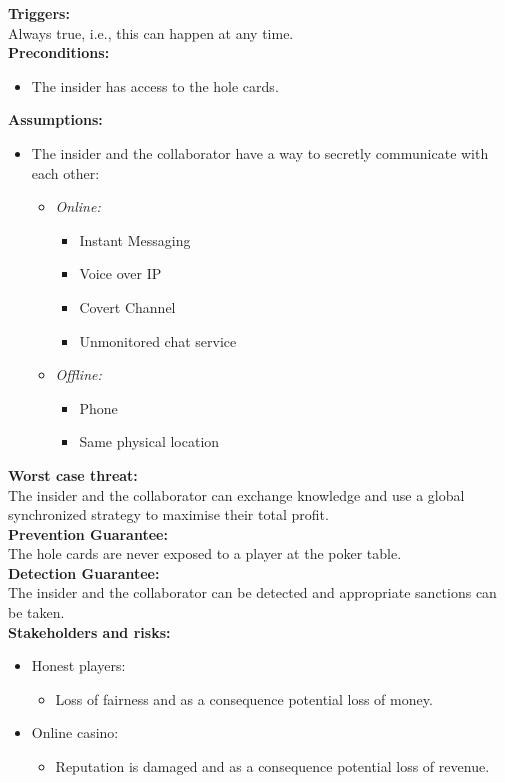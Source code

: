 \documentclass[a4paper,11pt]{report}
\begin{document}
\textbf{Triggers:}\\
Always true, i.e., this can happen at any time. \\
\textbf{Preconditions:}
\begin{itemize}
\item The insider has access to the hole cards.
\end{itemize}
\textbf{Assumptions:}
\begin{itemize}
\item The insider and the collaborator have a way to secretly communicate with each other:
\begin{itemize}
\item \emph{Online:}
\begin{itemize}
\item Instant Messaging
\item Voice over IP
\item Covert Channel
\item Unmonitored chat service
\end{itemize}
\item \emph{Offline:}
\begin{itemize}
\item Phone
\item Same physical location
\end{itemize}
\end{itemize}
\end{itemize}
\textbf{Worst case threat:}\\
The insider and the collaborator can exchange knowledge and use a global synchronized strategy to maximise their total profit. \\
\textbf{Prevention Guarantee:} \\
The hole cards are never exposed to a player at the poker table. \\
\textbf{Detection Guarantee:} \\
The insider and the collaborator can be detected and appropriate sanctions can be taken. \\
\textbf{Stakeholders and risks:}
\begin{itemize}
\item Honest players: 
\begin{itemize}
\item Loss of fairness and as a consequence potential loss of money.
\end{itemize}
\item Online casino: 
\begin{itemize}
\item Reputation is damaged and as a consequence potential loss of revenue.
\end{itemize}
\end{itemize}
\end{document}
